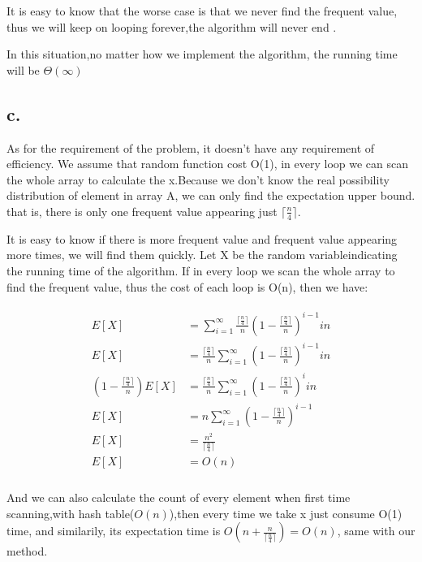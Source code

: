 \documentclass[oneside]{homework} %
\begin{document}
It is easy to know that the worse case is that we never find the frequent value, thus we will keep on looping forever,the algorithm will never end .

In this situation,no matter how we implement the algorithm, the running time will be $\Theta(\infty)$

\subsection*{c.}
As for the requirement of the problem, it doesn't have any requirement of efficiency. We assume that random function cost O(1), in every loop we can scan the whole array to calculate the x.Because we don't know the real possibility distribution of element in array A, we can only find the expectation upper bound. that is, there is only one frequent value appearing just $\lceil \frac{n}{4} \rceil$. 

It is easy to know if there is more frequent value and frequent value appearing more times, we will find them quickly. Let X be the random variableindicating the running time of the algorithm.
If in every loop we scan the whole array to find the frequent value, thus the cost of each loop is O(n), then we have:

\begin{eqnarray}
  \begin{split}
	E[X] &=  \sum_{i=1}^{\infty}\frac{\lceil \frac{n}{4} \rceil}{n} (1- \frac{\lceil \frac{n}{4} \rceil}{n})^{i-1}in \\
	E[X] &= \frac{\lceil \frac{n}{4} \rceil}{n} \sum_{i=1}^{\infty} (1- \frac{\lceil \frac{n}{4} \rceil}{n})^{i-1}in \\
	(1- \frac{\lceil \frac{n}{4} \rceil}{n})E[X]&= \frac{\lceil \frac{n}{4} \rceil}{n}  \sum_{i=1}^{\infty}(1- \frac{\lceil \frac{n}{4} \rceil}{n})^{i}in \\
	E[X]&= n\sum_{i=1}^{\infty}(1- \frac{\lceil \frac{n}{4} \rceil}{n})^{i-1} \\
	E[X]&= \frac{n^{2}}{\lceil \frac{n}{4} \rceil} \\
	E[X]&= O(n) \\
  \end{split}
  \label{equ:1st}
\end{eqnarray}



And we can also calculate the count of every element when first time scanning,with hash table($O(n)$),then every time we take x just consume O(1) time, and similarily, its expectation time is $O(n +\frac{n}{\lceil \frac{n}{4} \rceil}) = O(n)$, same with our method.
\end{document}
